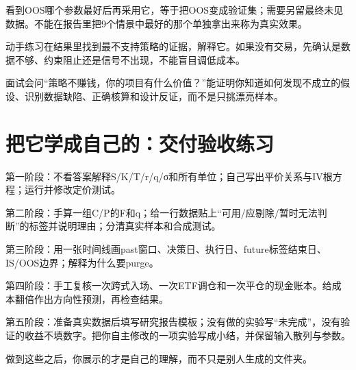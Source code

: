 \documentclass[UTF8,11pt,a4paper]{ctexart}
\begin{document}
看到OOS哪个参数最好后再采用它，等于把OOS变成验证集；需要另留最终未见数据。不能在报告里把9个情景中最好的那个单独拿出来称为真实效果。

\begin{learningbox}{动手练习}在结果里找到最不支持策略的证据，解释它。如果没有交易，先确认是数据不够、约束阻止还是信号不出现，不能盲目调低成本。\end{learningbox}

\begin{learningbox}{面试会问}“策略不赚钱，你的项目有什么价值？”能证明你知道如何发现不成立的假设、识别数据缺陷、正确核算和设计反证，而不是只挑漂亮样本。\end{learningbox}


\section{把它学成自己的：交付验收练习}

第一阶段：不看答案解释S/K/T/r/q/σ和所有单位；自己写出平价关系与IV根方程；运行并修改定价测试。

第二阶段：手算一组C/P的F和q；给一行数据贴上“可用/应剔除/暂时无法判断”的标签并说明理由；分清真实样本和合成测试。

第三阶段：用一张时间线画past窗口、决策日、执行日、future标签结束日、IS/OOS边界；解释为什么要purge。

第四阶段：手工复核一次跨式入场、一次ETF调仓和一次平仓的现金账本。给成本翻倍作出方向性预测，再检查结果。

第五阶段：准备真实数据后填写研究报告模板；没有做的实验写“未完成”，没有验证的收益不填数字。把你自主修改的一项实验写成小结，并保留输入散列与参数。

做到这些之后，你展示的才是自己的理解，而不只是别人生成的文件夹。
\end{document}
